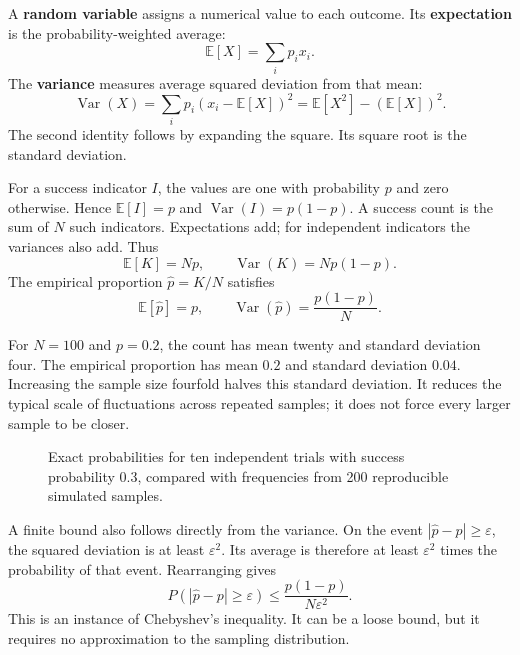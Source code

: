 \documentclass[11pt,oneside,openany]{book}
\theoremstyle{definition}
\theoremstyle{remark}
\numberwithin{equation}{chapter}
\begin{document}
A \textbf{random variable} assigns a numerical value to each outcome. Its \textbf{expectation} is the probability-weighted average: \[\mathbb E[X]=\sum_i p_ix_i.\] The \textbf{variance} measures average squared deviation from that mean: \[\operatorname{Var}(X)=\sum_i p_i(x_i-\mathbb E[X])^2
=\mathbb E[X^2]-(\mathbb E[X])^2.\] The second identity follows by expanding the square. Its square root is the standard deviation.

For a success indicator \(I\), the values are one with probability \(p\) and zero otherwise. Hence \(\mathbb E[I]=p\) and \(\operatorname{Var}(I)=p(1-p)\). A success count is the sum of \(N\) such indicators. Expectations add; for independent indicators the variances also add. Thus \[\mathbb E[K]=Np,\qquad \operatorname{Var}(K)=Np(1-p).\] The empirical proportion \(\widehat p=K/N\) satisfies \[\mathbb E[\widehat p]=p,\qquad
\operatorname{Var}(\widehat p)=\frac{p(1-p)}N.\]

For \(N=100\) and \(p=0.2\), the count has mean twenty and standard deviation four. The empirical proportion has mean \(0.2\) and standard deviation \(0.04\). Increasing the sample size fourfold halves this standard deviation. It reduces the typical scale of fluctuations across repeated samples; it does not force every larger sample to be closer.

\begin{figure}[htbp]\centering
{}
\caption{Exact probabilities for ten independent trials with success probability 0.3, compared with frequencies from 200 reproducible simulated samples.}\end{figure}

A finite bound also follows directly from the variance. On the event \(|\widehat p-p|\geq\varepsilon\), the squared deviation is at least \(\varepsilon^2\). Its average is therefore at least \(\varepsilon^2\) times the probability of that event. Rearranging gives \[P(|\widehat p-p|\geq\varepsilon)
\leq\frac{p(1-p)}{N\varepsilon^2}.\] This is an instance of Chebyshev's inequality. It can be a loose bound, but it requires no approximation to the sampling distribution.
\end{document}
